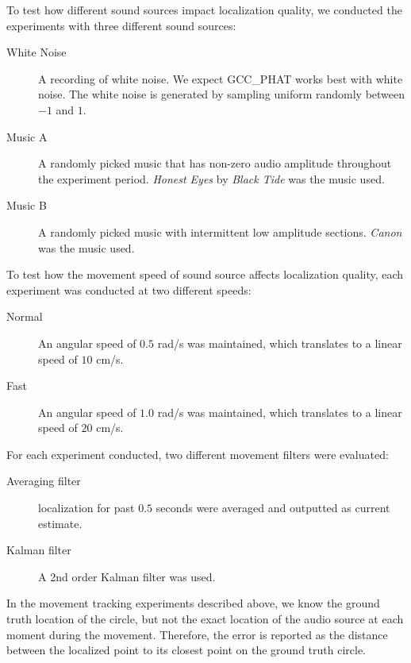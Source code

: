 To test how different sound sources impact localization quality, we conducted the experiments with three different sound sources:
\begin{description}%

\item[White Noise] A recording of white noise. We expect GCC\_PHAT works best with white noise. The white noise is generated by sampling uniform randomly between $-1$ and $1$.

\item[Music A] A randomly picked music that has non-zero audio amplitude throughout the experiment period. \emph{Honest Eyes} by \emph{Black Tide} was the music used.

\item[Music B] A randomly picked music with intermittent low amplitude sections. \emph{Canon} was the music used.

\end{description} 

To test how the movement speed of sound source affects localization quality, each experiment was conducted at two different speeds:

\begin{description}
\item[Normal] An angular speed of $0.5$ rad/s was maintained, which translates to a linear speed of $10$ cm/s.
\item[Fast] An angular speed of $1.0$ rad/s was maintained, which translates to a linear speed of $20$ cm/s.
\end{description}

For each experiment conducted, two different movement filters were evaluated:
\begin{description}%
\item[Averaging filter] localization for past $0.5$ seconds were averaged and outputted as current estimate.
\item[Kalman filter] A 2nd order Kalman filter was used.
\end{description}

In the movement tracking experiments described above, we know the ground truth location of the circle, but not the exact location of the audio source at each moment during the movement. Therefore, the error is reported as the distance between the localized point to its closest point on the ground truth circle.
\clearpage

